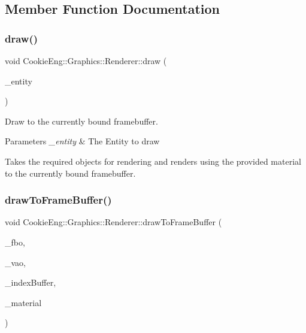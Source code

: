\subsection{Member Function Documentation}
\mbox{\label{class_cookie_eng_1_1_graphics_1_1_renderer_a5cadfbd80259f0188e52880c47ac7573}} 
\subsubsection{\texorpdfstring{draw()}{draw()}}
{\footnotesize\ttfamily void Cookie\+Eng\+::\+Graphics\+::\+Renderer\+::draw (\begin{DoxyParamCaption}\item[{\hyperlink{class_cookie_eng_1_1_e_c_s_1_1_entity}{E\+C\+S\+::\+Entity} \&}]{\+\_\+entity }\end{DoxyParamCaption})}



Draw to the currently bound framebuffer. 


\begin{DoxyParams}{Parameters}
{\em \+\_\+entity} & The Entity to draw\\
\hline
\end{DoxyParams}
Takes the required objects for rendering and renders using the provided material to the currently bound framebuffer. \mbox{\label{class_cookie_eng_1_1_graphics_1_1_renderer_aa32e62971f191a434ab457f9ac84ac31}} 
\subsubsection{\texorpdfstring{draw\+To\+Frame\+Buffer()}{drawToFrameBuffer()}}
{\footnotesize\ttfamily void Cookie\+Eng\+::\+Graphics\+::\+Renderer\+::draw\+To\+Frame\+Buffer (\begin{DoxyParamCaption}\item[{const \hyperlink{class_cookie_eng_1_1_graphics_1_1_frame_buffer}{Frame\+Buffer} \&}]{\+\_\+fbo,  }\item[{const \hyperlink{class_cookie_eng_1_1_graphics_1_1_vertex_array}{Vertex\+Array} \&}]{\+\_\+vao,  }\item[{const \hyperlink{class_cookie_eng_1_1_graphics_1_1_vertex_buffer}{Vertex\+Buffer} \&}]{\+\_\+index\+Buffer,  }\item[{const \hyperlink{class_cookie_eng_1_1_resources_1_1_material}{Resources\+::\+Material} \&}]{\+\_\+material }\end{DoxyParamCaption})}



